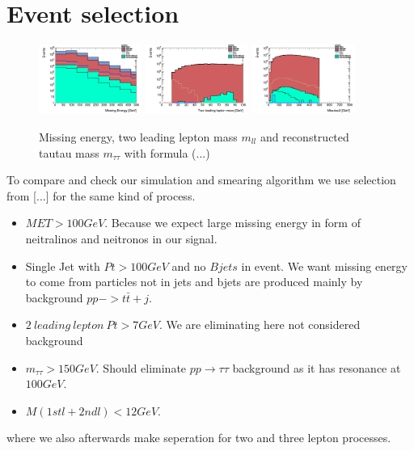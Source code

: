 \documentclass[tightenline,notitlepage,nofootinbib]{revtex4-1}
\begin{document}

\section{Event selection}


\begin{figure}[!ht]
  \centering
  \includegraphics[width=0.3\textwidth]{h_MET.png}
  \includegraphics[width=0.3\textwidth]{h_llmass.png}
  \includegraphics[width=0.3\textwidth]{h_Mtautau2.png}
  \caption{Missing energy, two leading lepton mass $m_{ll}$ and reconstructed tautau mass $m_{\tau\tau}$ with formula (...)}
\end{figure}

To compare and check our simulation and smearing algorithm we use selection from [...] for the same kind of process.  
\begin{itemize}
\item $MET>100 GeV$. Because we expect large missing energy in form of neitralinos and neitronos in our signal.
\item Single Jet with $Pt>100GeV$ and no $Bjets$ in event. We want missing energy to come from particles not in jets and bjets are produced mainly by background $pp->t \bar t + j$.
\item $2~ leading ~ lepton ~ Pt > 7 GeV$. We are eliminating here not considered background
\item $m_{\tau \tau}>150 GeV$. Should eliminate $pp\rightarrow \tau \tau$ background as it has resonance at $100 GeV$. 
\item $M(1st l + 2nd l)<12 GeV$.
\end{itemize}
where we also afterwards make seperation for two and three lepton processes. 
\end{document}
